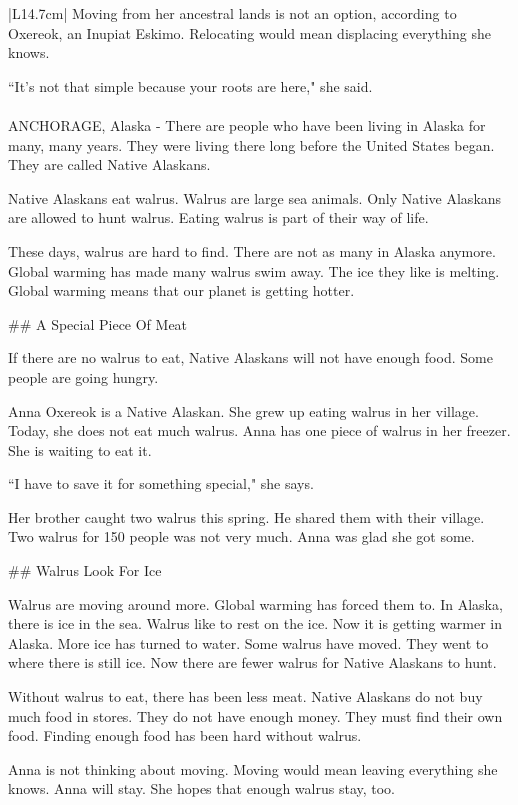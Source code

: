 \begin{table}
\begin{center}
\begin{tabular}{|L{14.7cm}|}
Moving from her ancestral lands is not an option, according to Oxereok, an Inupiat Eskimo. Relocating would mean displacing everything she knows.

``It's not that simple because your roots are here," she said. \\ \hline \hline
{} \\ \hline 
\tiny ANCHORAGE, Alaska - There are people who have been living in Alaska for many, many years. They were living there long before the United States began. They are called Native Alaskans.

Native Alaskans eat walrus. Walrus are large sea animals. Only Native Alaskans are allowed to hunt walrus. Eating walrus is part of their way of life.

These days, walrus are hard to find. There are not as many in Alaska anymore. Global warming has made many walrus swim away. The ice they like is melting. Global warming means that our planet is getting hotter.

\#\# A Special Piece Of Meat

If there are no walrus to eat, Native Alaskans will not have enough food. Some people are going hungry.

Anna Oxereok is a Native Alaskan. She grew up eating walrus in her village. Today, she does not eat much walrus. Anna has one piece of walrus in her freezer. She is waiting to eat it.

``I have to save it for something special," she says.

Her brother caught two walrus this spring. He shared them with their village. Two walrus for 150 people was not very much. Anna was glad she got some.

\#\# Walrus Look For Ice

Walrus are moving around more. Global warming has forced them to. In Alaska, there is ice in the sea. Walrus like to rest on the ice. Now it is getting warmer in Alaska. More ice has turned to water. Some walrus have moved. They went to where there is still ice. Now there are fewer walrus for Native Alaskans to hunt.

Without walrus to eat, there has been less meat. Native Alaskans do not buy much food in stores. They do not have enough money. They must find their own food. Finding enough food has been hard without walrus.

Anna is not thinking about moving. Moving would mean leaving everything she knows. Anna will stay. She hopes that enough walrus stay, too. \\ \hline
\end{tabular}
\end{center}
\caption{\label{table:example2} Example 2 of an aligned document pair missed by our BERT-based model, titled \textit{walrus-alaska}.}
\end{table}


